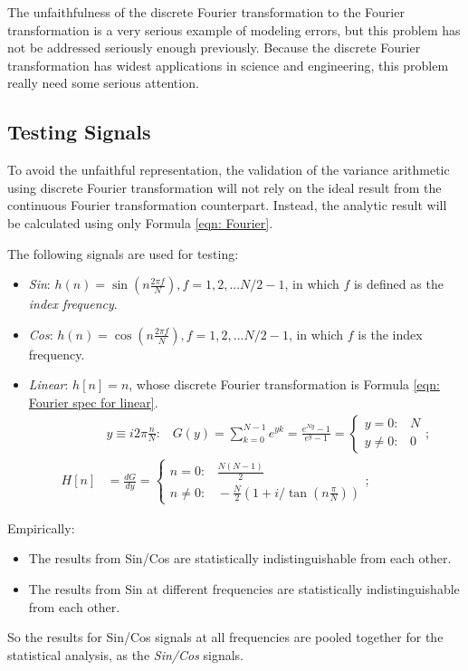 \documentclass[twoside]{article}
\numberwithin{equation}{section}
\newcommand{\eqspace}{\;\;\;}
\begin{document}
The unfaithfulness of the discrete Fourier transformation to the Fourier transformation is a very serious example of modeling errors, but this problem has not be addressed seriously enough previously.
Because the discrete Fourier transformation has widest applications in science and engineering, this problem really need some serious attention.



\subsection{Testing Signals}

To avoid the unfaithful representation, the validation of the variance arithmetic using discrete Fourier transformation will not rely on the ideal result from the continuous Fourier transformation counterpart.
Instead, the analytic result will be calculated using only Formula \eqref{eqn: Fourier}.

The following signals are used for testing:
\begin{itemize}
\item \emph{Sin}: $h(n) = \sin(n \frac{2\pi f}{N}), f = 1, 2, ... N/2 -1$, in which $f$ is defined as the \emph{index frequency}.

\item \emph{Cos}: $h(n) = \cos(n \frac{2\pi f}{N}), f = 1, 2, ... N/2 -1$, in which $f$ is the index frequency.

\item \emph{Linear}: $h[n] = n$, whose discrete Fourier transformation is Formula \eqref{eqn: Fourier spec for linear}.
\begin{align}
& y \equiv i 2\pi \frac{n}{N}: \eqspace G(y) = \sum_{k=0}^{N-1}  e^{y k} = \frac{e^{N y} - 1}{e^y - 1}
 = \begin{cases} y = 0: \eqspace N \\ y \neq 0: \eqspace 0 \end{cases}; \nonumber \\
\label{eqn: Fourier spec for linear}
H[n] &= \frac{d G}{d y} = \begin{cases} n = 0: \eqspace \frac{N (N-1)}{2} \\ n \neq 0: \eqspace - \frac{N}{2}(1 + i /\tan(n \frac{\pi}{N})) \end{cases};
\end{align}

\end{itemize}

Empirically:
\begin{itemize}
\item The results from Sin/Cos are statistically indistinguishable from each other.

\item The results from Sin at different frequencies are statistically indistinguishable from each other.
\end{itemize}
So the results for Sin/Cos signals at all frequencies are pooled together for the statistical analysis, as the \emph{Sin/Cos} signals.
\end{document}

